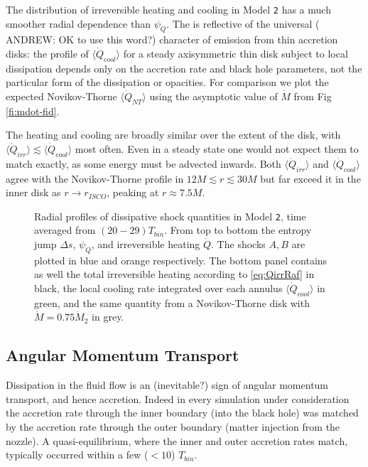 \documentclass{emulateapj}
\newcommand{\De}{\Delta}
\newcommand{\model}[1]{{Model \texttt{#1}}}
\newcommand{\avet}[1]{ \langle #1 \rangle}
\begin{document}
The distribution of irreversible heating and cooling in \model{2} has a much smoother radial dependence than $\psi_Q$. The is reflective of the universal ({\color{red} ANDREW: OK to use this word?}) character of emission from thin accretion disks: the profile of $\avet{\dot{Q}_{cool}}$ for a steady axisymmetric thin disk subject to local dissipation depends only on the accretion rate and black hole parameters, not the particular form of the dissipation or opacities.  For comparison we plot the expected Novikov-Thorne $\avet{\dot{Q}_{NT}}$ using the asymptotic value of $\dot{M}$ from Fig \ref{fi:mdot-fid}. 

The heating and cooling are broadly similar over the extent of the disk, with $\avet{\dot{Q}_{irr}} \lesssim \avet{\dot{Q}_{cool}}$ most often.  Even in a steady state one would not expect them to match exactly, as some energy must be advected inwards.  Both $\avet{\dot{Q}_{irr}}$ and $\avet{\dot{Q}_{cool}}$ agree with the Novikov-Thorne profile in $12 M \lesssim r \lesssim 30M$ but far exceed it in the inner disk as $r \to r_{ISCO}$, peaking at $r \approx 7.5M$.

\begin{figure}
\caption{\label{fi:diss} Radial profiles of dissipative shock quantities in \model{2}, time averaged from $(20 - 29) T_{bin}$.  From top to bottom the entropy jump $\De s$, $\psi_Q$, and irreversible heating $\dot{Q}$. The shocks $A,B$ are plotted in blue and orange respectively.  The bottom panel contains as well the total irreversible heating according to \eqref{eq:QirrRaf} in black, the local cooling rate integrated over each annulus $\avet{\dot{Q}_{cool}}$ in green, and the same quantity from a Novikov-Thorne disk with $\dot{M} = 0.75 \dot{M}_2$ in grey.}
\end{figure}

\subsection{Angular Momentum Transport}
\label{subsec:angmom}

Dissipation in the fluid flow is an (inevitable?) sign of angular momentum transport, and hence accretion. Indeed in every simulation under consideration the accretion rate through the inner boundary (into the black hole) was matched by the accretion rate through the outer boundary (matter injection from the nozzle).  A quasi-equilibrium, where the inner and outer accretion rates match, typically occurred within a few ($<10$) $T_{bin}$. 
\end{document}
